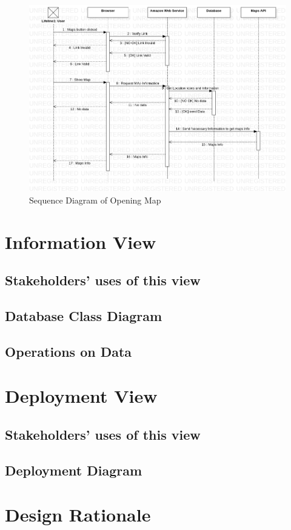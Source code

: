 \begin{figure}[H]
    \includegraphics[scale = 0.5]{assets/SequenceDiagramMaps.png}
    \caption[Sequence Diagram of Opening Map]{Sequence Diagram of Opening Map}
\end{figure}

\section{Information View}

\subsection{Stakeholders' uses of this view}

\subsection{Database Class Diagram}

\subsection{Operations on Data}

\section{Deployment View}

\subsection{Stakeholders' uses of this view}

\subsection{Deployment Diagram}

\section{Design Rationale}